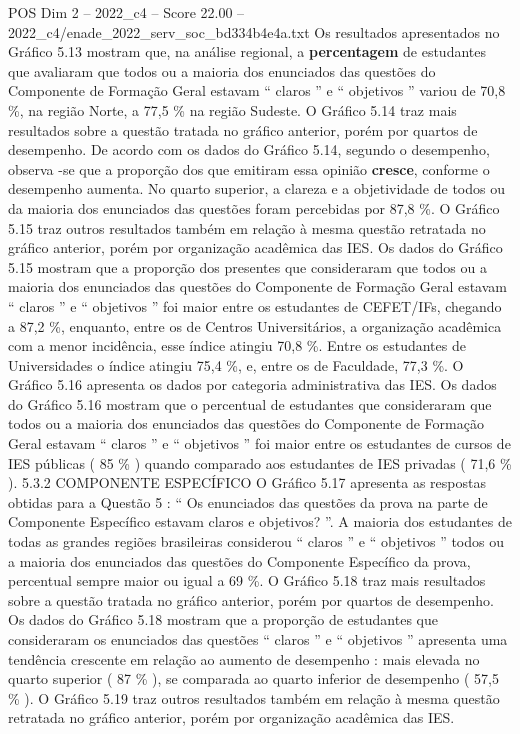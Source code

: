 \begin{textsample}{POS Dim 2 – 2022\_c4 – Score 22.00 – 2022\_c4/enade\_2022\_serv\_soc\_bd334b4e4a.txt}
Os resultados apresentados no Gráfico 5.13 mostram que, na análise regional, a \textbf{percentagem} de estudantes que avaliaram que todos ou a maioria dos enunciados das questões do Componente de Formação Geral estavam “ claros ” e “ objetivos ” variou de 70,8 \%, na região Norte, a 77,5 \% na região Sudeste.
O Gráfico 5.14 traz mais resultados sobre a questão tratada no gráfico anterior, porém por quartos de desempenho.
De acordo com os dados do Gráfico 5.14, segundo o desempenho, observa -se que a proporção dos que emitiram essa opinião \textbf{cresce}, conforme o desempenho aumenta.
No quarto superior, a clareza e a objetividade de todos ou da maioria dos enunciados das questões foram percebidas por 87,8 \%.
O Gráfico 5.15 traz outros resultados também em relação à mesma questão retratada no gráfico anterior, porém por organização acadêmica das IES.
Os dados do Gráfico 5.15 mostram que a proporção dos presentes que consideraram que todos ou a maioria dos enunciados das questões do Componente de Formação Geral estavam “ claros ” e “ objetivos ” foi maior entre os estudantes de CEFET/IFs, chegando a 87,2 \%, enquanto, entre os de Centros Universitários, a organização acadêmica com a menor incidência, esse índice atingiu 70,8 \%.
Entre os estudantes de Universidades o índice atingiu 75,4 \%, e, entre os de Faculdade, 77,3 \%.
O Gráfico 5.16 apresenta os dados por categoria administrativa das IES.
Os dados do Gráfico 5.16 mostram que o percentual de estudantes que consideraram que todos ou a maioria dos enunciados das questões do Componente de Formação Geral estavam “ claros ” e “ objetivos ” foi maior entre os estudantes de cursos de IES públicas ( 85 \% ) quando comparado aos estudantes de IES privadas ( 71,6 \% ). 5.3.2 COMPONENTE ESPECÍFICO O Gráfico 5.17 apresenta as respostas obtidas para a Questão 5 : “ Os enunciados das questões da prova na parte de Componente Específico estavam claros e objetivos? ”.
A maioria dos estudantes de todas as grandes regiões brasileiras considerou “ claros ” e “ objetivos ” todos ou a maioria dos enunciados das questões do Componente Específico da prova, percentual sempre maior ou igual a 69 \%.
O Gráfico 5.18 traz mais resultados sobre a questão tratada no gráfico anterior, porém por quartos de desempenho.
Os dados do Gráfico 5.18 mostram que a proporção de estudantes que consideraram os enunciados das questões “ claros ” e “ objetivos ” apresenta uma tendência crescente em relação ao aumento de desempenho : mais elevada no quarto superior ( 87 \% ), se comparada ao quarto inferior de desempenho ( 57,5 \% ).
O Gráfico 5.19 traz outros resultados também em relação à mesma questão retratada no gráfico anterior, porém por organização acadêmica das IES.

\end{textsample}
